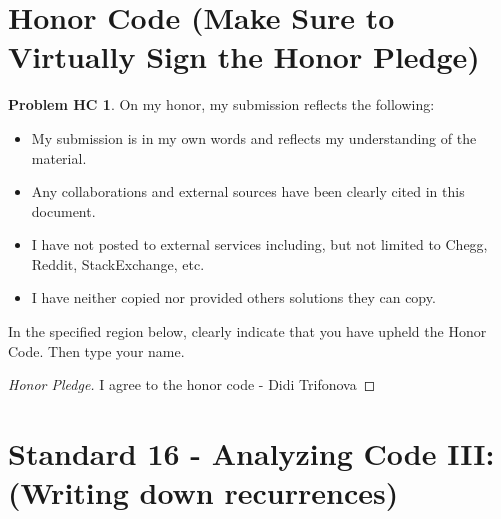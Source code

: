 \documentclass[11pt]{article}
\theoremstyle{definition}
\theoremstyle{definition}
\newtheorem*{requiredHC}{Problem HC}
\theoremstyle{definition}
\begin{document}
\section*{Honor Code (Make Sure to Virtually Sign the Honor Pledge)} 
\hypertarget{HonorCode}{}

\begin{requiredHC}
On my honor, my submission reflects the following:
\begin{itemize}
\item My submission is in my own words and reflects my understanding of the material.
\item Any collaborations and external sources have been clearly cited in this document.
\item I have not posted to external services including, but not limited to Chegg, Reddit, StackExchange, etc.
\item I have neither copied nor provided others solutions they can copy.
\end{itemize}

\noindent In the specified region below, clearly indicate that you have upheld the Honor Code. Then type your name. 
\end{requiredHC}

\begin{proof}[Honor Pledge]
I agree to the honor code  - Didi Trifonova
\end{proof}


\newpage
\section{Standard 16 - Analyzing Code III: (Writing down recurrences)}
\end{document}
